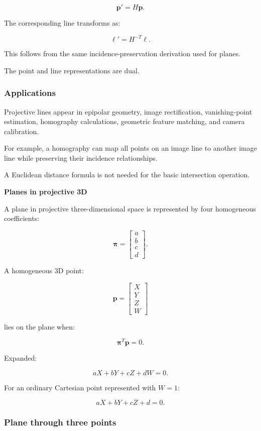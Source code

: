 \[
 \mathbf p'=H\mathbf p.
\]

The corresponding line transforms as:

\[
 \boxed{ \boldsymbol\ell'=H^{-T}\boldsymbol\ell }.
\]

This follows from the same incidence-preservation derivation used for planes.

The point and line representations are dual.

\subsubsection{Applications}\label{applications}

Projective lines appear in epipolar geometry, image rectification, vanishing-point estimation, homography calculations, geometric feature matching, and camera calibration.

For example, a homography can map all points on an image line to another image line while preserving their incidence relationships.

A Euclidean distance formula is not needed for the basic intersection operation.

\textbf{Planes in projective 3D}

A plane in projective three-dimensional space is represented by four homogeneous coefficients:

\[
 \boxed{ \boldsymbol\pi= \begin{bmatrix} a\\b\\c\\d \end{bmatrix} }.
\]

A homogeneous 3D point:

\[
 \mathbf p= \begin{bmatrix} X\\Y\\Z\\W \end{bmatrix}
\]

lies on the plane when:

\[
 \boxed{ \boldsymbol\pi^T\mathbf p=0 }.
\]

Expanded:

\[
 \boxed{ aX+bY+cZ+dW=0 }.
\]

For an ordinary Cartesian point represented with \(W=1\):

\[
 aX+bY+cZ+d=0.
\]

\subsubsection{Plane through three points}\label{plane-through-three-points}

